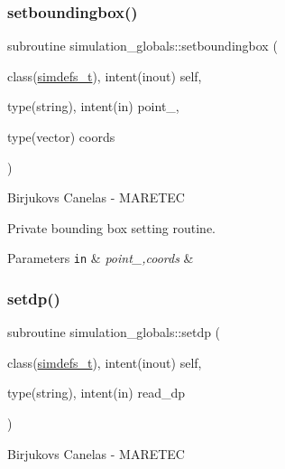 \subsubsection{\texorpdfstring{setboundingbox()}{setboundingbox()}}
{\footnotesize\ttfamily subroutine simulation\+\_\+globals\+::setboundingbox (\begin{DoxyParamCaption}\item[{class(\hyperlink{structsimulation__globals_1_1simdefs__t}{simdefs\+\_\+t}), intent(inout)}]{self,  }\item[{type(string), intent(in)}]{point\+\_\+,  }\item[{type(vector)}]{coords }\end{DoxyParamCaption})\hspace{0.3cm}{\ttfamily [private]}}



Birjukovs Canelas -\/ M\+A\+R\+E\+T\+EC 

Private bounding box setting routine. 
\begin{DoxyParams}[1]{Parameters}
\mbox{\tt in}  & {\em point\+\_\+,coords} & \\
\hline
\end{DoxyParams}
\mbox{\label{namespacesimulation__globals_a9a8e88c06937b7cf6be9d9bf30f54ba9}} 
\subsubsection{\texorpdfstring{setdp()}{setdp()}}
{\footnotesize\ttfamily subroutine simulation\+\_\+globals\+::setdp (\begin{DoxyParamCaption}\item[{class(\hyperlink{structsimulation__globals_1_1simdefs__t}{simdefs\+\_\+t}), intent(inout)}]{self,  }\item[{type(string), intent(in)}]{read\+\_\+dp }\end{DoxyParamCaption})\hspace{0.3cm}{\ttfamily [private]}}



Birjukovs Canelas -\/ M\+A\+R\+E\+T\+EC 

